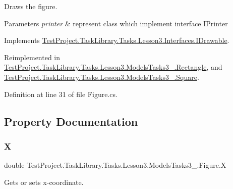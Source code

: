 Draws the figure. 


\begin{DoxyParams}{Parameters}
{\em printer} & represent class which implement interface I\+Printer\\
\hline
\end{DoxyParams}


Implements \mbox{\hyperlink{interface_test_project_1_1_task_library_1_1_tasks_1_1_lesson3_1_1_interfaces_1_1_i_drawable_a42d4b370fc36d2f695e312d7780c05d6}{Test\+Project.\+Task\+Library.\+Tasks.\+Lesson3.\+Interfaces.\+I\+Drawable}}.



Reimplemented in \mbox{\hyperlink{class_test_project_1_1_task_library_1_1_tasks_1_1_lesson3_1_1_models_tasks3__4_1_1_rectangle_a907edce9a5bc56a45b69cae79d9d5322}{Test\+Project.\+Task\+Library.\+Tasks.\+Lesson3.\+Models\+Tasks3\+\_.\+Rectangle}}, and \mbox{\hyperlink{class_test_project_1_1_task_library_1_1_tasks_1_1_lesson3_1_1_models_tasks3__4_1_1_square_a564aa1273ffb7fa43c6e5774c4702716}{Test\+Project.\+Task\+Library.\+Tasks.\+Lesson3.\+Models\+Tasks3\+\_.\+Square}}.



Definition at line 31 of file Figure.\+cs.



\subsection{Property Documentation}
\mbox{\label{class_test_project_1_1_task_library_1_1_tasks_1_1_lesson3_1_1_models_tasks3__4_1_1_figure_a3d9c1e93520690af9e2231ffd49bf7b8}} 
\subsubsection{\texorpdfstring{X}{X}}
{\footnotesize\ttfamily double Test\+Project.\+Task\+Library.\+Tasks.\+Lesson3.\+Models\+Tasks3\+\_.\+Figure.\+X\hspace{0.3cm}{\ttfamily [get]}}



Gets or sets x-\/coordinate. 



